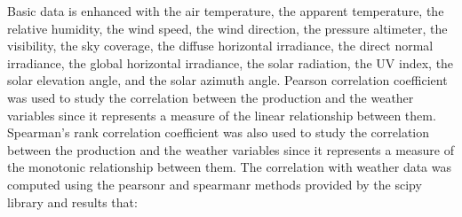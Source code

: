 Basic data is enhanced with the air temperature, the apparent temperature, the relative humidity, the wind speed, the wind direction, the pressure altimeter, the visibility, the sky coverage, the diffuse horizontal irradiance, the direct normal irradiance, the global horizontal irradiance, the solar radiation, the UV index, the solar elevation angle, and the solar azimuth angle.
Pearson correlation coefficient was used to study the correlation between the production and the weather variables since it represents a measure of the linear relationship between them.
Spearman's rank correlation coefficient was also used to study the correlation between the production and the weather variables since it represents a measure of the monotonic relationship between them.
The correlation with weather data was computed using the pearsonr and spearmanr methods provided by the scipy library and results that:
